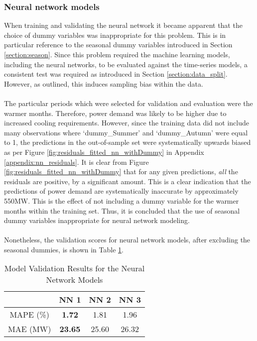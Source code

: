 \documentclass[11pt]{article}
\begin{document}
\subsubsection{Neural network models}

When training and validating the neural network it became apparent that the choice of dummy variables was inappropriate for this problem. This is in particular reference to the seasonal dummy variables introduced in Section \ref{section:season}. Since this problem required the machine learning models, including the neural networks, to be evaluated against the time-series models, a consistent test was required as introduced in Section \ref{section:data_split}. However, as outlined, this induces sampling bias within the data.
\\
\\
The particular periods which were selected for validation and evaluation were the warmer months. Therefore, power demand was likely to be higher due to increased cooling requirements. However, since the training data did not include many observations where `dummy\_Summer' and `dummy\_Autumn' were equal to 1, the predictions in the out-of-sample set were systematically upwards biased as per Figure \ref{fig:residuals_fitted_nn_withDummy} in Appendix \ref{appendix:nn_residuals}. It is clear from Figure \ref{fig:residuals_fitted_nn_withDummy} that for any given predictions, \textit{all} the residuals are positive, by a significant amount. This is a clear indication that the predictions of power demand are systematically inaccurate by approximately 550MW. This is the effect of not including a dummy variable for the warmer months within the training set. Thus, it is concluded that the use of seasonal dummy variables inappropriate for neural network modeling.
\\
\\
Nonetheless, the validation scores for neural network models, after excluding the seasonal dummies, is shown in Table \ref{table:model_validation_nn}.

\begin{table}[H]
\centering
\caption{Model Validation Results for the Neural Network Models}
\label{table:model_validation_nn}
\begin{tabular}{@{}cccc@{}}
\toprule
 & \textbf{NN 1} & \textbf{NN 2} & \textbf{NN 3} \\ \midrule
MAPE (\%) & \textbf{1.72} & 1.81 & 1.96 \\
MAE (MW) & \textbf{23.65} & 25.60 & 26.32 \\ \bottomrule
\end{tabular}
\end{table}
\end{document}
